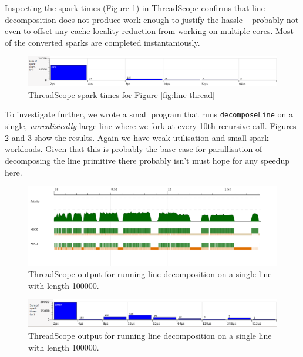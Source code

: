 \documentclass[12pt, a4paper]{article}
\begin{document}
Inspecting the spark times (Figure \ref{fig:line-thread-sparks}) in ThreadScope confirms that line
decomposition does not produce work enough to justify the hassle --
probably not even to offset any cache locality reduction from working 
on multiple cores. Most of the converted sparks are completed instantaniously.

\begin{figure}[h!]
  \centering
  \includegraphics[width=0.85\linewidth]{../threadscope/lines/single-split-spark-times}
  \caption{ThreadScope spark times for Figure \ref{fig:line-thread}}
  \label{fig:line-thread-sparks}
\end{figure}

To investigate further, we wrote a small program that runs \texttt{decomposeLine} on a single, \textit{unrealisically} large line where
 we fork at every 10th recursive call. Figures \ref{fig:single-line-thread} and \ref{fig:single-line-thread-sparks} show the results. Again we have
 weak utilisation and small spark workloads. Given that this is probably the base case for parallisation of decomposing the line primitive there
  probably isn't must hope for any speedup here.

\begin{figure}[h!]
  \centering
  \includegraphics[width=0.85\linewidth]{../threadscope/lines/single-line-every-10}
  \caption{ThreadScope output for running line decomposition on a single line with length
    100000.}
  \label{fig:single-line-thread}
\end{figure}

\begin{figure}[h!]
  \centering
  \includegraphics[width=0.85\linewidth]{../threadscope/lines/single-line-every-10-spark-times}
  \caption{ThreadScope output for running line decomposition on a single line with length
    100000.}
  \label{fig:single-line-thread-sparks}
\end{figure}
\end{document}
